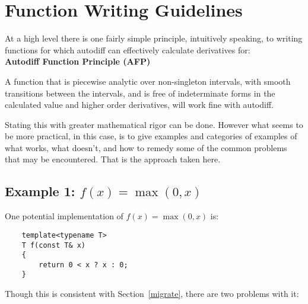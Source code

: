 \documentclass{article}
\begin{document}
\section{Function Writing Guidelines}

At a high level there is one fairly simple principle, intuitively speaking, to writing functions for which autodiff
can effectively calculate derivatives for: \\

{\bf Autodiff Function Principle (AFP)}
\begin{displayquote}
A function that is piecewise analytic over non-singleton intervals, with smooth transitions between the intervals,
and is free of indeterminate forms in the calculated value and higher order derivatives, will work fine with autodiff.
\end{displayquote}
Stating this with greater mathematical rigor can be done. However what seems to be more practical, in this
case, is to give examples and categories of examples of what works, what doesn't, and how to remedy some of the
common problems that may be encountered. That is the approach taken here.

\subsection{Example 1: $f(x)=\max(0,x)$}

One potential implementation of $f(x)=\max(0,x)$ is:

\begin{verbatim}
    template<typename T>
    T f(const T& x)
    {
        return 0 < x ? x : 0;
    }
\end{verbatim}
Though this is consistent with Section~\ref{migrate}, there are two problems with it:
\end{document}
